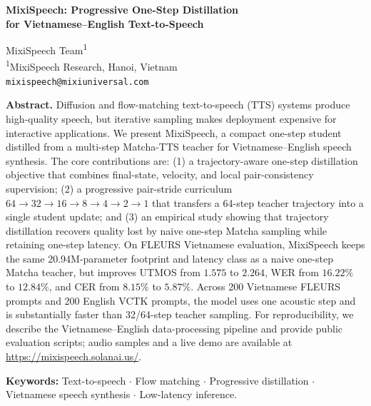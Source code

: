 \documentclass[10pt,twoside]{article}
\newcommand{\method}{MixiSpeech}
\begin{document}
\thispagestyle{empty}

\begin{center}
\vspace*{0.45cm}
{\LARGE\bfseries
\method: Progressive One-Step Distillation\\
for Vietnamese--English Text-to-Speech\par}
\vspace{0.85cm}
{\normalsize
MixiSpeech Team\textsuperscript{1}\\}
\vspace{0.35cm}
{\small
\textsuperscript{1}MixiSpeech Research, Hanoi, Vietnam\\
\texttt{mixispeech@mixiuniversal.com}}
\end{center}

\vspace{0.65cm}

\begin{center}
\begin{minipage}{0.88\textwidth}
\small
\noindent\textbf{Abstract.}
Diffusion and flow-matching text-to-speech (TTS) systems produce high-quality
speech, but iterative sampling makes deployment expensive for interactive
applications. We present \method, a compact one-step student distilled from a
multi-step Matcha-TTS teacher for Vietnamese--English speech synthesis. The core
contributions are: (1) a trajectory-aware one-step distillation objective that
combines final-state, velocity, and local pair-consistency supervision; (2) a
progressive pair-stride curriculum
$64 \rightarrow 32 \rightarrow 16 \rightarrow 8 \rightarrow 4 \rightarrow 2
\rightarrow 1$ that transfers a 64-step teacher trajectory into a single
student update; and (3) an empirical study showing that trajectory
distillation recovers quality lost by naive one-step Matcha sampling while
retaining one-step latency. On FLEURS Vietnamese evaluation, \method{} keeps the
same 20.94M-parameter footprint and latency class as a naive one-step Matcha
teacher, but improves UTMOS from $1.575$ to $2.264$, WER from $16.22\%$ to
$12.84\%$, and CER from $8.15\%$ to $5.87\%$. Across 200 Vietnamese FLEURS
prompts and 200 English VCTK prompts, the model uses one acoustic step and is
substantially faster than 32/64-step teacher sampling. For reproducibility, we
describe the Vietnamese--English data-processing pipeline and provide public
evaluation scripts; audio samples and a live demo are available at
\url{https://mixispeech.solanai.us/}.

\vspace{0.55em}
\noindent\textbf{Keywords:}
Text-to-speech $\cdot$ Flow matching $\cdot$ Progressive distillation $\cdot$
Vietnamese speech synthesis $\cdot$ Low-latency inference.
\end{minipage}
\end{center}
\end{document}
